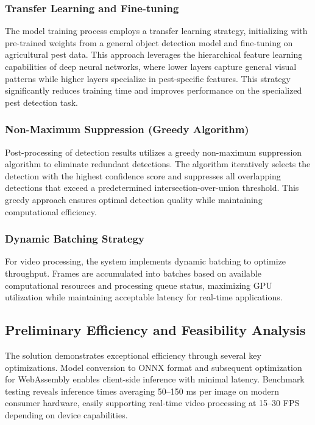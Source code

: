 \subsubsection{Transfer Learning and Fine-tuning}
The model training process employs a transfer learning strategy, initializing with pre-trained weights from a general object detection model and fine-tuning on agricultural pest data. This approach leverages the hierarchical feature learning capabilities of deep neural networks, where lower layers capture general visual patterns while higher layers specialize in pest-specific features. This strategy significantly reduces training time and improves performance on the specialized pest detection task.

\subsubsection{Non-Maximum Suppression (Greedy Algorithm)}
Post-processing of detection results utilizes a greedy non-maximum suppression algorithm to eliminate redundant detections. The algorithm iteratively selects the detection with the highest confidence score and suppresses all overlapping detections that exceed a predetermined intersection-over-union threshold. This greedy approach ensures optimal detection quality while maintaining computational efficiency.

\subsubsection{Dynamic Batching Strategy}
For video processing, the system implements dynamic batching to optimize throughput. Frames are accumulated into batches based on available computational resources and processing queue status, maximizing GPU utilization while maintaining acceptable latency for real-time applications.

\subsection{Preliminary Efficiency and Feasibility Analysis}
The solution demonstrates exceptional efficiency through several key optimizations. Model conversion to ONNX format and subsequent optimization for WebAssembly enables client-side inference with minimal latency. Benchmark testing reveals inference times averaging 50--150 ms per image on modern consumer hardware, easily supporting real-time video processing at 15--30 FPS depending on device capabilities.

